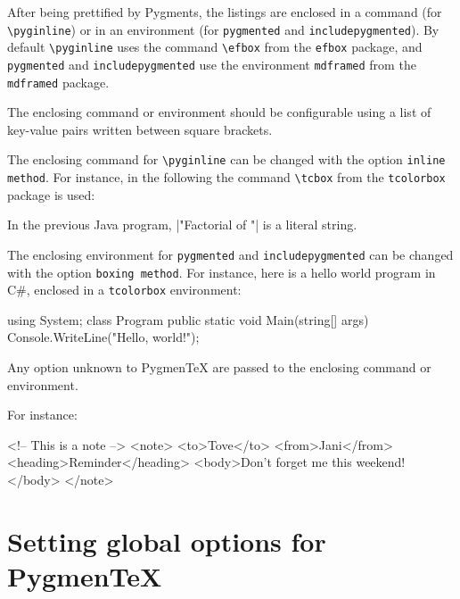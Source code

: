 \documentclass[10pt,a4paper]{article}
\begin{document}
After being prettified by Pygments, the listings are enclosed in a
command (for \verb|\pyginline|) or in an environment (for
\verb|pygmented| and \verb|includepygmented|). By default
\verb|\pyginline| uses the command \verb|\efbox| from the \texttt{efbox}
package, and \verb|pygmented| and \verb|includepygmented| use the
environment \verb|mdframed| from the \texttt{mdframed} package.

The enclosing command or environment should be configurable using a list
of key-value pairs written between square brackets.

The enclosing command for
\verb|\pyginline| can be changed with the option
\verb|inline method|. For instance, in the following the command
\verb|\tcbox| from the \verb|tcolorbox| package is used:

\begin{Example}
  In the previous Java program,
  \pyginline[lang=java,inline method=tcbox]|"Factorial of "| is a
  literal string.
\end{Example}

The enclosing environment for \verb|pygmented| and
\verb|includepygmented| can be changed with the option
\verb|boxing method|. For instance, here is a hello world program in
C\#, enclosed in a \verb|tcolorbox| environment:

\begin{Example}
\begin{pygmented}[lang=csharp,boxing method=tcolorbox]
using System;
class Program
{
    public static void Main(string[] args)
    {
        Console.WriteLine("Hello, world!");
    }
}
\end{pygmented}
\end{Example}

Any option unknown to Pygmen\TeX{} are passed to the enclosing command
or environment.

For instance:

\begin{Example}
\begin{pygmented}[lang=xml,boxing method=tcolorbox,colframe=red,boxrule=2mm]
<!-- This is a note -->
<note>
   <to>Tove</to>
   <from>Jani</from>
   <heading>Reminder</heading>
   <body>Don't forget me this weekend!</body>
</note>
\end{pygmented}
\end{Example}

\section{Setting global options for Pygmen\TeX{}}
\end{document}
